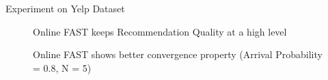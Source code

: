 \begin{frame}{Experiment on Yelp Dataset}


\begin{figure}[htbp]
\centering
{}%
%
\caption{Online FAST keeps Recommendation Quality at a high level}
\end{figure}

\begin{figure}
%
%
\centering
\caption{Online FAST shows better convergence property (Arrival Probability = 0.8, N = 5)}
\end{figure}
\end{frame}


